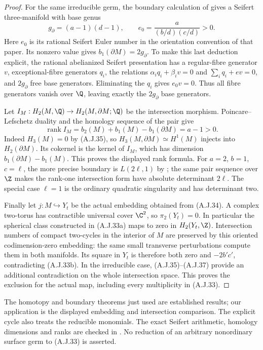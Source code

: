 \begin{proof}
For the same irreducible germ, the boundary calculation
of \cite[Theorem 4.1 and Lemma 4.6]{MPW2005Hirzebruch}
gives a Seifert three-manifold with base genus
\[
 g_\partial=(a-1)(d-1),\qquad
 e_0=\frac{a}{(b/d)(c/d)}>0.                     \tag{A.J.36}
\]
Here $e_0$ is its rational Seifert Euler number in
the orientation convention of that paper. Its
nonzero value gives
$b_1(\partial M)=2g_\partial$. To make this last
deduction explicit, the rational abelianized Seifert
presentation has a regular-fibre generator $v$,
exceptional-fibre generators $q_i$, the relations
$\alpha_iq_i+\beta_iv=0$ and
$\sum_iq_i+ev=0$, and $2g_\partial$ free base
generators. Eliminating the $q_i$ gives $e_0v=0$.
Thus all fibre generators vanish over $\Q$, leaving
exactly the $2g_\partial$ base generators.

Let $I_M:H_2(M,\Q)\to H_2(M,\partial M;\Q)$ be
the intersection morphism. Poincare--Lefschetz duality
and the homology sequence of the pair give
\[
 \operatorname{rank} I_M
   =b_2(M)+b_1(M)-b_1(\partial M)=a-1>0.          \tag{A.J.37}
\]
Indeed $H_3(M)=0$ by (A.J.35), so
$H_3(M,\partial M)\simeq H^1(M)$ injects into
$H_2(\partial M)$. Its cokernel is the kernel of
$I_M$, which has dimension
$b_1(\partial M)-b_1(M)$. This proves the displayed
rank formula. For $a=2$, $b=1$, $c=\ell$, the
more precise boundary is $L(2\ell,1)$ by
\cite[Theorem 4.2(2)]{MPW2005Hirzebruch}; the same
pair sequence over $\Z$ makes the rank-one
intersection form have absolute determinant
$2\ell$. The special case $\ell=1$ is the ordinary
quadratic singularity and has determinant two.

Finally let $j:M\hookrightarrow Y_t$ be the actual
embedding obtained from (A.J.34). A complex two-torus
has contractible universal cover $\C^2$, so
$\pi_2(Y_t)=0$. In particular the spherical class
constructed in (A.J.33a) maps to zero in
$H_2(Y_t,\Z)$. Intersection numbers of compact
two-cycles in the interior of $M$ are preserved by
this oriented codimension-zero embedding: the same
small transverse perturbations compute them in
both manifolds. Its square in $Y_t$ is therefore
both zero and $-2b'c'$, contradicting (A.J.33b).
In the irreducible case, (A.J.35)--(A.J.37) provide
an additional contradiction on the whole intersection
space.
This proves the exclusion for the actual map,
including every multiplicity in (A.J.33).
\end{proof}

The homotopy and boundary theorems just used are
established results; our application is the displayed
embedding and intersection comparison. The explicit
cycle also treats the reducible monomials. The exact
Seifert arithmetic, homology dimensions and ranks
are checked in . No
reduction of an arbitrary nonordinary surface germ
to (A.J.33) is asserted.

